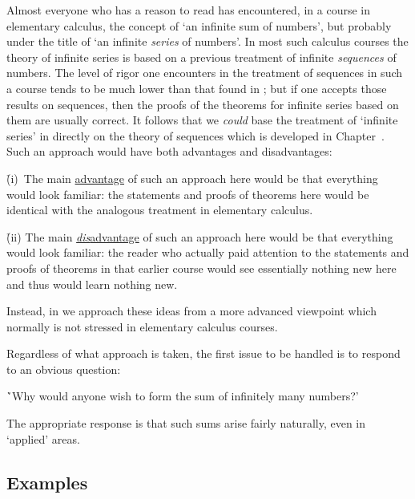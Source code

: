         Almost everyone who has a reason to read {\TheseNotes} has encountered, in a course in elementary calculus, the concept of `an infinite sum of numbers',
    but probably under the title of `an infinite {\em series} of numbers'.
    In most such calculus courses the theory of infinite series is based on a previous treatment of infinite {\em sequences} of numbers.
    The level of rigor one encounters in the treatment of sequences in such a course tends to be much lower than that found in {\TheseNotes};
    but if one accepts those results on sequences, then the proofs of the theorems for infinite series based on them are usually correct.
    It follows that we {\em could} base the treatment of `infinite series' in {\TheseNotes}
    directly on the theory of sequences which is developed in Chapter~.
    Such an approach would have both advantages and disadvantages:


       \h (i)\, The main \underline{advantage} of such an approach here would be that everything would look familiar:
    the statements and proofs of theorems here would be identical with the analogous treatment in elementary calculus.

       \h (ii) The main \underline{{\em dis}advantage} of such an approach here would be that everything would look familiar:
    the reader who actually paid attention to the statements and proofs of theorems in that earlier course
    would see essentially nothing new here and thus would learn nothing new.

        Instead, in {\TheseNotes} we approach these ideas from a more advanced viewpoint which normally is not stressed in elementary calculus courses.

\V

        Regardless of what approach is taken, the first issue to be handled is to respond to an obvious question:

      \h  `Why would anyone wish to form the sum of infinitely many numbers?'

\noindent The appropriate response is that such sums arise fairly naturally, even in `applied' areas.

\V


            \subsection{\small{\bf Examples}}
            \label{ExampG20.10}

